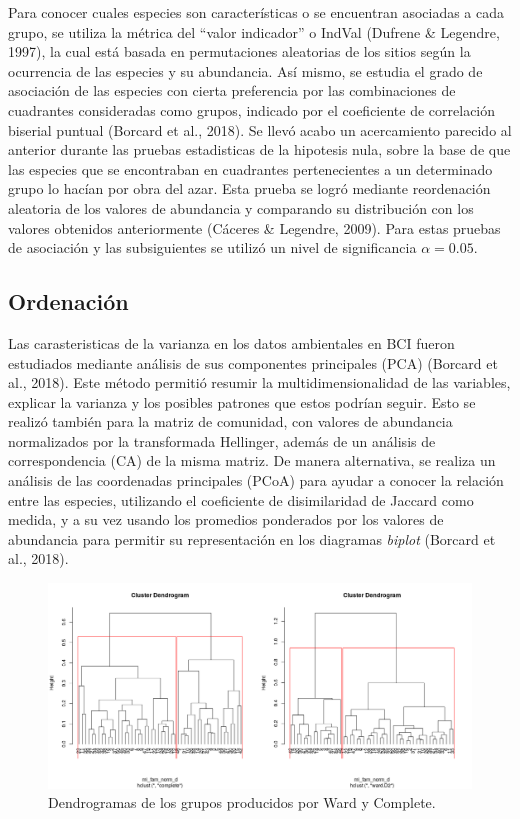 \documentclass[11pt,]{article}
\begin{document}
Para conocer cuales especies son características o se encuentran
asociadas a cada grupo, se utiliza la métrica del ``valor indicador'' o
IndVal (Dufrene \& Legendre, 1997), la cual está basada en permutaciones
aleatorias de los sitios según la ocurrencia de las especies y su
abundancia. Así mismo, se estudia el grado de asociación de las especies
con cierta preferencia por las combinaciones de cuadrantes consideradas
como grupos, indicado por el coeficiente de correlación biserial puntual
(Borcard et al., 2018). Se llevó acabo un acercamiento parecido al
anterior durante las pruebas estadisticas de la hipotesis nula, sobre la
base de que las especies que se encontraban en cuadrantes pertenecientes
a un determinado grupo lo hacían por obra del azar. Esta prueba se logró
mediante reordenación aleatoria de los valores de abundancia y
comparando su distribución con los valores obtenidos anteriormente
(Cáceres \& Legendre, 2009). Para estas pruebas de asociación y las
subsiguientes se utilizó un nivel de significancia \(\alpha = 0.05\).

\subsection{Ordenación}\label{ordenaciuxf3n}

Las carasteristicas de la varianza en los datos ambientales en BCI
fueron estudiados mediante análisis de sus componentes principales (PCA)
(Borcard et al., 2018). Este método permitió resumir la
multidimensionalidad de las variables, explicar la varianza y los
posibles patrones que estos podrían seguir. Esto se realizó también para
la matriz de comunidad, con valores de abundancia normalizados por la
transformada Hellinger, además de un análisis de correspondencia (CA) de
la misma matriz. De manera alternativa, se realiza un análisis de las
coordenadas principales (PCoA) para ayudar a conocer la relación entre
las especies, utilizando el coeficiente de disimilaridad de Jaccard como
medida, y a su vez usando los promedios ponderados por los valores de
abundancia para permitir su representación en los diagramas
\emph{biplot} (Borcard et al., 2018).

\begin{figure}
\centering
\includegraphics{grupos_ward_complete_altura_corte2.png}
\caption{Dendrogramas de los grupos producidos por Ward y Complete.
\label{fig:grupos_ward_complete_altura_corte2}}
\end{figure}
\end{document}
